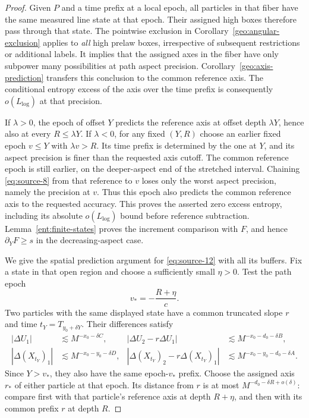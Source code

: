 \begin{proof}
Given $P$ and a time prefix at a local epoch, all particles in that
fiber have the same measured line state at that epoch.  Their
assigned high boxes therefore pass through that state.  The
pointwise exclusion in Corollary~\ref{geo:angular-exclusion} applies to
\emph{all} high prelaw boxes, irrespective of subsequent restrictions
or additional labels.  It implies that the assigned axes in the
fiber have only subpower many possibilities at path aspect
precision.  Corollary~\ref{geo:axis-prediction} transfers this conclusion
to the common reference axis.  The conditional entropy excess of
the axis over the time prefix is consequently $o(L_{\log})$ at that
precision.

If $\lambda>0$, the epoch of offset $Y$ predicts the reference axis
at offset depth $\lambda Y$, hence also at every $R\leq\lambda Y$.
If $\lambda<0$, for any fixed $(Y,R)$ choose an earlier fixed epoch
$v\leq Y$ with $\lambda v>R$.  Its time prefix is determined by the
one at $Y$, and its aspect precision is finer than the requested
axis cutoff.  The common reference epoch is still earlier, on the
deeper-aspect end of the stretched interval.  Chaining
\eqref{eq:source-8} from that reference to $v$ loses only the worst
aspect precision, namely the precision at $v$.  Thus this epoch
also predicts the common reference axis to the requested accuracy.
This proves the asserted zero excess entropy, including its
absolute $o(L_{\log})$ bound before reference subtraction.
Lemma~\ref{ent:finite-states} proves the increment comparison with
$F$, and hence $\partial_YF\geq s$ in the decreasing-aspect case.

We give the spatial prediction argument for
\eqref{eq:source-12} with all its buffers.  Fix a state in that open
region and choose a sufficiently small $\eta>0$.  Test the path epoch
\[
v_*=-\frac{R+\eta}{c}.
\]
Two particles with the same displayed state have a common truncated
slope $r$ and time $t_Y=T_{y_0+\delta Y}$.  Their differences satisfy
\begin{align*}
|\Delta U_1|&\lesssim M^{-x_0-\delta C},&
|\Delta U_2-r\Delta U_1|
 &\lesssim M^{-x_0-d_0-\delta B},\\
|\Delta(X_{t_Y})_1|&\lesssim M^{-x_0-y_0-\delta D},&
|\Delta(X_{t_Y})_2-r\Delta(X_{t_Y})_1|
 &\lesssim M^{-x_0-y_0-d_0-\delta A}.
\end{align*}
Since $Y>v_*$, they also have the same epoch-$v_*$ prefix.  Choose
the assigned axis $r_*$ of either particle at that epoch.  Its
distance from $r$ is at most
$M^{-d_0-\delta R+o(\delta)}$: compare first with that particle's
reference axis at depth $R+\eta$, and then with its common prefix
$r$ at depth $R$.


\end{proof}
